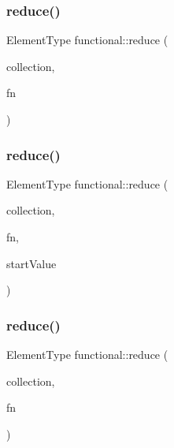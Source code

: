 \mbox{\label{namespacefunctional_a707ee32d465e1aac105f7e58e0212e5a}} 
\subsubsection{\texorpdfstring{reduce()}{reduce()}\hspace{0.1cm}{\footnotesize\ttfamily [2/4]}}
{\footnotesize\ttfamily Element\+Type functional\+::reduce (\begin{DoxyParamCaption}\item[{Collection\+Type}]{collection,  }\item[{Element\+Type($\ast$)(Element\+Type e1, Element\+Type e2)}]{fn }\end{DoxyParamCaption})}

\mbox{\label{namespacefunctional_a06b2f43d0a2b896f975500f36b38246e}} 
\subsubsection{\texorpdfstring{reduce()}{reduce()}\hspace{0.1cm}{\footnotesize\ttfamily [3/4]}}
{\footnotesize\ttfamily Element\+Type functional\+::reduce (\begin{DoxyParamCaption}\item[{Collection\+Type}]{collection,  }\item[{Element\+Type($\ast$)(const Element\+Type \&e1, const Element\+Type \&e2)}]{fn,  }\item[{Element\+Type}]{start\+Value }\end{DoxyParamCaption})}

\mbox{\label{namespacefunctional_a8c8e88003f7c24bbdd1d9a2d029dde1d}} 
\subsubsection{\texorpdfstring{reduce()}{reduce()}\hspace{0.1cm}{\footnotesize\ttfamily [4/4]}}
{\footnotesize\ttfamily Element\+Type functional\+::reduce (\begin{DoxyParamCaption}\item[{Collection\+Type}]{collection,  }\item[{Element\+Type($\ast$)(const Element\+Type \&e1, const Element\+Type \&e2)}]{fn }\end{DoxyParamCaption})}

